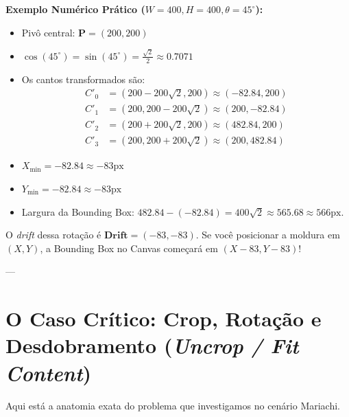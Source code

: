 \documentclass[12pt,a4paper]{article}
\begin{document}
\textbf{Exemplo Numérico Prático ($W=400, H=400, \theta=45^\circ$):}
\begin{itemize}
    \item Pivô central: $\mathbf{P} = (200, 200)$
    \item $\cos(45^\circ) = \sin(45^\circ) = \frac{\sqrt{2}}{2} \approx 0.7071$
    \item Os cantos transformados são:
    \begin{align*}
    C'_0 &= (200 - 200\sqrt{2}, 200) \approx (-82.84, 200) \\
    C'_1 &= (200, 200 - 200\sqrt{2}) \approx (200, -82.84) \\
    C'_2 &= (200 + 200\sqrt{2}, 200) \approx (482.84, 200) \\
    C'_3 &= (200, 200 + 200\sqrt{2}) \approx (200, 482.84)
    \end{align*}
    \item $X_{\min} = -82.84 \approx -83\text{px}$
    \item $Y_{\min} = -82.84 \approx -83\text{px}$
    \item Largura da Bounding Box: $482.84 - (-82.84) = 400\sqrt{2} \approx 565.68 \approx 566\text{px}$.
\end{itemize}

O \textit{drift} dessa rotação é $\mathbf{Drift} = (-83, -83)$. Se você posicionar a moldura em $(X, Y)$, a Bounding Box no Canvas começará em $(X - 83, Y - 83)$!

---

\section{O Caso Crítico: Crop, Rotação e Desdobramento (\textit{Uncrop / Fit Content})}

Aqui está a anatomia exata do problema que investigamos no cenário Mariachi.
\end{document}
